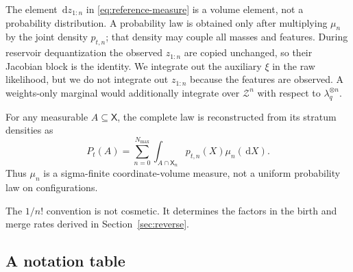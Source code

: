\documentclass[10pt]{article}
\theoremstyle{definition}
\theoremstyle{remark}
\newcommand{\dd}{\,\mathrm{d}}
\newcommand{\state}{\mathsf{X}}
\begin{document}
The element $\dd z_{1:n}$ in \eqref{eq:reference-measure} is a volume
element, not a probability distribution.  A probability law is obtained
only after multiplying $\mu_n$ by the joint density $p_{t,n}$; that density
may couple all masses and features.  During reservoir dequantization the
observed $z_{1:n}$ are copied unchanged, so their Jacobian block is the
identity.  We integrate out the auxiliary $\xi$ in the raw likelihood, but
we do not integrate out $z_{1:n}$ because the features are observed.  A
weights-only marginal would additionally integrate over $\mathcal Z^n$
with respect to $\lambda_q^{\otimes n}$.

For any measurable $A\subseteq\state$, the complete law is reconstructed
from its stratum densities as
\begin{equation}
  P_t(A)=\sum_{n=0}^{N_{\max}}
  \int_{A\cap\state_n}p_{t,n}(X)\mu_n(\dd X).
  \label{eq:full-law-from-strata}
\end{equation}
Thus $\mu_n$ is a sigma-finite coordinate-volume measure, not a uniform
probability law on configurations.

The $1/n!$ convention is not cosmetic.  It determines the factors in the birth and merge rates derived in Section~\ref{sec:reverse}.

\subsection{A notation table}
\end{document}
